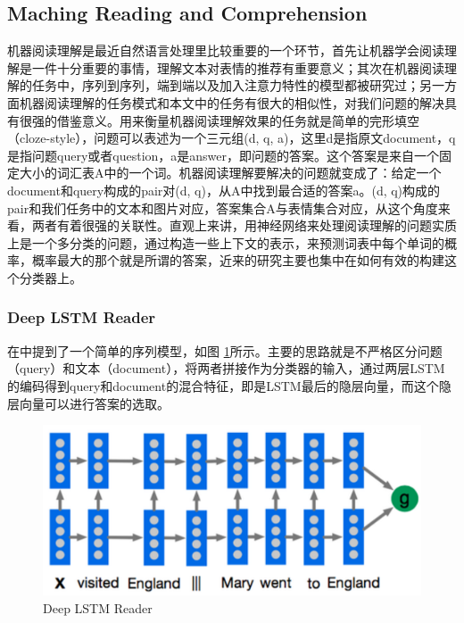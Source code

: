 \documentclass[10pt, titlepage]{article}
\begin{document}
	\subsection{Maching Reading and Comprehension}
		机器阅读理解是最近自然语言处理里比较重要的一个环节，首先让机器学会阅读理解是一件十分重要的事情，理解文本对表情的推荐有重要意义；其次在机器阅读理解的任务中，序列到序列，端到端以及加入注意力特性的模型都被研究过；另一方面机器阅读理解的任务模式和本文中的任务有很大的相似性，对我们问题的解决具有很强的借鉴意义。用来衡量机器阅读理解效果的任务就是简单的完形填空（cloze-style），问题可以表述为一个三元组(d, q, a)，这里d是指原文document，q是指问题query或者question，a是answer，即问题的答案。这个答案是来自一个固定大小的词汇表A中的一个词。机器阅读理解要解决的问题就变成了：给定一个document和query构成的pair对(d, q)，从A中找到最合适的答案a。(d, q)构成的pair和我们任务中的文本和图片对应，答案集合A与表情集合对应，从这个角度来看，两者有着很强的关联性。直观上来讲，用神经网络来处理阅读理解的问题实质上是一个多分类的问题，通过构造一些上下文的表示，来预测词表中每个单词的概率，概率最大的那个就是所谓的答案，近来的研究主要也集中在如何有效的构建这个分类器上。

		\subsubsection{Deep LSTM Reader}
		在\cite{hermann2015teaching}中提到了一个简单的序列模型，如图 \ref{fig:DeepLSTMReader}所示。主要的思路就是不严格区分问题（query）和文本（document），将两者拼接作为分类器的输入，通过两层LSTM的编码得到query和document的混合特征，即是LSTM最后的隐层向量，而这个隐层向量可以进行答案的选取。
			\begin{figure}[htb]
			\centering
			\includegraphics[width=0.6\columnwidth]{figs/1.png}
			\caption{Deep LSTM Reader}
			\label{fig:DeepLSTMReader}
			\end{figure}
\end{document}
